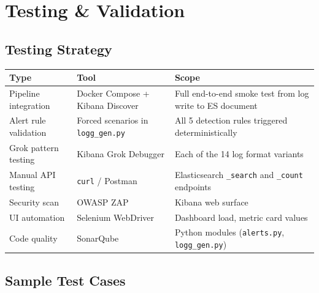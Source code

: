 \documentclass[12pt,a4paper]{article}
\newcommand{\file}[1]{\texttt{\color{accent}#1}}
\begin{document}
\newpage

\section{Testing \& Validation}

\subsection{Testing Strategy}

\begin{center}
\begin{tabular}{p{3.5cm}p{3cm}p{6.5cm}}
  \toprule
  \textbf{Type} & \textbf{Tool} & \textbf{Scope} \\
  \midrule
  Pipeline integration & Docker Compose + Kibana Discover & Full end-to-end smoke test from log write to ES document \\
  Alert rule validation & Forced scenarios in \file{logg\_gen.py} & All 5 detection rules triggered deterministically \\
  Grok pattern testing  & Kibana Grok Debugger & Each of the 14 log format variants \\
  Manual API testing    & \texttt{curl} / Postman & Elasticsearch \texttt{\_search} and \texttt{\_count} endpoints \\
  Security scan         & OWASP ZAP & Kibana web surface \\
  UI automation         & Selenium WebDriver & Dashboard load, metric card values \\
  Code quality          & SonarQube & Python modules (\file{alerts.py}, \file{logg\_gen.py}) \\
  \bottomrule
\end{tabular}
\end{center}

\subsection{Sample Test Cases}
\end{document}
